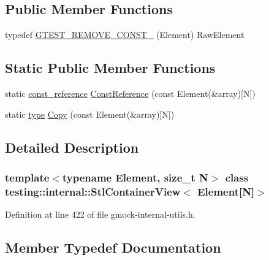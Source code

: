 \subsection*{Public Member Functions}
\begin{DoxyCompactItemize}
\item 
typedef \hyperlink{classtesting_1_1internal_1_1StlContainerView_3_01Element[N]_4_af8c1aa62de6f8a5d3126c7b3badfefdb}{G\+T\+E\+S\+T\+\_\+\+R\+E\+M\+O\+V\+E\+\_\+\+C\+O\+N\+S\+T\+\_\+} (Element) Raw\+Element
\end{DoxyCompactItemize}
\subsection*{Static Public Member Functions}
\begin{DoxyCompactItemize}
\item 
static \hyperlink{classtesting_1_1internal_1_1StlContainerView_3_01Element[N]_4_a481e6ab99316939484fad9c561af5e28}{const\+\_\+reference} \hyperlink{classtesting_1_1internal_1_1StlContainerView_3_01Element[N]_4_aa1b15d7f43d38751ae19f6dbdcb6aba3}{Const\+Reference} (const Element(\&array)\mbox{[}N\mbox{]})
\item 
static \hyperlink{classtesting_1_1internal_1_1StlContainerView_3_01Element[N]_4_a364efca99cc5a02829b4e3413c506b09}{type} \hyperlink{classtesting_1_1internal_1_1StlContainerView_3_01Element[N]_4_af2cf79fbd7f829229a47b52f863c68f8}{Copy} (const Element(\&array)\mbox{[}N\mbox{]})
\end{DoxyCompactItemize}


\subsection{Detailed Description}
\subsubsection*{template$<$typename Element, size\+\_\+t N$>$\newline
class testing\+::internal\+::\+Stl\+Container\+View$<$ Element\mbox{[}\+N\mbox{]}$>$}



Definition at line 422 of file gmock-\/internal-\/utils.\+h.



\subsection{Member Typedef Documentation}
\mbox{\label{classtesting_1_1internal_1_1StlContainerView_3_01Element[N]_4_a481e6ab99316939484fad9c561af5e28}} 
